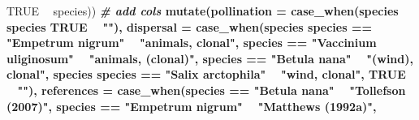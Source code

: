 \documentclass[
]{article}
\newenvironment{Shaded}{\begin{snugshade}}{\end{snugshade}}
\newcommand{\CommentTok}[1]{\textcolor[rgb]{0.56,0.35,0.01}{\textit{#1}}}
\newcommand{\DataTypeTok}[1]{\textcolor[rgb]{0.13,0.29,0.53}{#1}}
\newcommand{\KeywordTok}[1]{\textcolor[rgb]{0.13,0.29,0.53}{\textbf{#1}}}
\newcommand{\NormalTok}[1]{#1}
\newcommand{\OperatorTok}[1]{\textcolor[rgb]{0.81,0.36,0.00}{\textbf{#1}}}
\newcommand{\OtherTok}[1]{\textcolor[rgb]{0.56,0.35,0.01}{#1}}
\newcommand{\StringTok}[1]{\textcolor[rgb]{0.31,0.60,0.02}{#1}}
\begin{document}
\begin{Shaded}
\begin{Highlighting}[]
{{{{{                              \OtherTok{TRUE} \OperatorTok{~}\StringTok{ }\NormalTok{species)) }\OperatorTok{%>%}\StringTok{ }
\StringTok{   }
\StringTok{   }\CommentTok{# add cols}
\StringTok{   }\KeywordTok{mutate}\NormalTok{(}\DataTypeTok{pollination =} \KeywordTok{case_when}\NormalTok{(species }\OperatorTok{%in%}\StringTok{ }\KeywordTok{c}\NormalTok{(}\StringTok{"Betula nana"}\NormalTok{, }\StringTok{"Salix arctophila"}\NormalTok{, }\StringTok{"Salix glauca"}\NormalTok{)  }\OperatorTok{~}\StringTok{ "wind"}\NormalTok{,}
\NormalTok{                                         species }\OperatorTok{%in%}\StringTok{ }\KeywordTok{c}\NormalTok{(}\StringTok{"Cassiope tetragona"}\NormalTok{, }\StringTok{"Rhododendron groenlandicum"}\NormalTok{, }\StringTok{"Rhododendron tomentosum"}\NormalTok{) }\OperatorTok{~}\StringTok{ "insects"}\NormalTok{,}
                                         \OtherTok{TRUE} \OperatorTok{~}\StringTok{ ""}\NormalTok{),}
          \DataTypeTok{dispersal =} \KeywordTok{case_when}\NormalTok{(species }\OperatorTok{%in%}\StringTok{ }\KeywordTok{c}\NormalTok{(}\StringTok{"Cassiope tetragona"}\NormalTok{, }\StringTok{"Phyllodoce caerulea"}\NormalTok{) }\OperatorTok{~}\StringTok{ "animals"}\NormalTok{,}
\NormalTok{                                species }\OperatorTok{==}\StringTok{ "Empetrum nigrum"} \OperatorTok{~}\StringTok{ "animals, clonal"}\NormalTok{,}
\NormalTok{                                species }\OperatorTok{==}\StringTok{ "Vaccinium uliginosum"} \OperatorTok{~}\StringTok{ "animals, (clonal)"}\NormalTok{,}
\NormalTok{                                species }\OperatorTok{==}\StringTok{ "Betula nana"} \OperatorTok{~}\StringTok{ "(wind), clonal"}\NormalTok{,}
\NormalTok{                                species }\OperatorTok{%in%}\StringTok{ }\KeywordTok{c}\NormalTok{(}\StringTok{"Rhododendron groenlandicum"}\NormalTok{, }\StringTok{"Rhododendron tomentosum"}\NormalTok{, }\StringTok{"Salix glauca"}\NormalTok{) }\OperatorTok{~}\StringTok{ "wind, (clonal)"}\NormalTok{,}
\NormalTok{                                species }\OperatorTok{==}\StringTok{ "Salix arctophila"} \OperatorTok{~}\StringTok{ "wind, clonal"}\NormalTok{,}
                                \OtherTok{TRUE} \OperatorTok{~}\StringTok{ ""}\NormalTok{),}
          \DataTypeTok{references =} \KeywordTok{case_when}\NormalTok{(species }\OperatorTok{==}\StringTok{ "Betula nana"} \OperatorTok{~}\StringTok{ "Tollefson (2007)"}\NormalTok{,}
\NormalTok{                                 species }\OperatorTok{==}\StringTok{ "Empetrum nigrum"} \OperatorTok{~}\StringTok{ "Matthews (1992a)"}\NormalTok{,}
}}}}}}}}}}
\end{Highlighting}
\end{Shaded}
\end{document}
